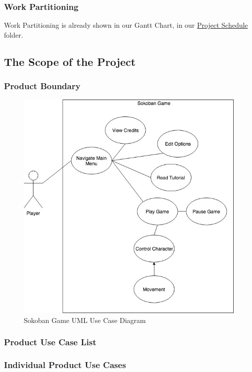 \documentclass[12pt, titlepage]{article}
\begin{document}
\subsubsection{Work Partitioning}

Work Partitioning is already shown in our Gantt Chart, in our \href{https://gitlab.cas.mcmaster.ca/kalerg1/se3xa3/tree/master/Sokoban-Game/ProjectSchedule}{Project Schedule} folder.

\subsection{The Scope of the Project}
\subsubsection{Product Boundary}
\begin{figure} [H]
\includegraphics[scale=0.5]{Sokoban.jpg}
\caption{Sokoban Game UML Use Case Diagram}  
\end{figure}

\subsubsection{Product Use Case List}
\subsubsection{Individual Product Use Cases}
\end{document}
